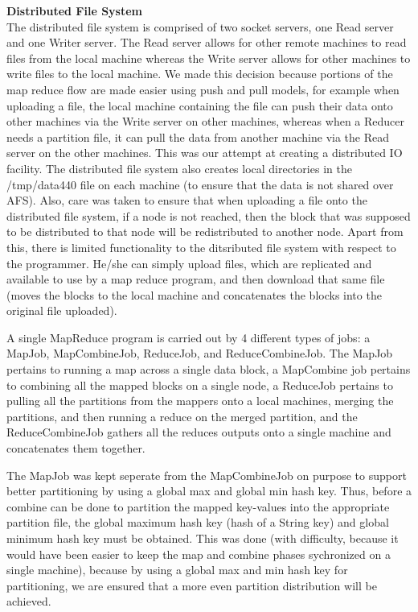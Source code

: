 \documentclass[11pt]{article}
\begin{document}
\textbf{Distributed File System}
\\The distributed file system is comprised of two socket servers, one Read server and one Writer server. The Read server allows for other remote machines to read files from the local machine whereas the Write server allows for other machines to write files to the local machine. We made this decision because portions of the map reduce flow are made easier using push and pull models, for example when uploading a file, the local machine containing the file can push their data onto other machines via the Write server on other machines, whereas when a Reducer needs a partition file, it can pull the data from another machine via the Read server on the other machines. This was our attempt at creating a distributed IO facility. The distributed file system also creates local directories in the /tmp/data440 file on each machine (to ensure that the data is not shared over AFS). Also, care was taken to ensure that when uploading a file onto the distributed file system, if a node is not reached, then the block that was supposed to be distributed to that node will be redistributed to another node. Apart from this, there is limited functionality to the ditsributed file system with respect to the programmer. He/she can simply upload files, which are replicated and available to use by a map reduce program, and then download that same file (moves the blocks to the local machine and concatenates the blocks into the original file uploaded).

A single MapReduce program is carried out by 4 different types of jobs: a MapJob, MapCombineJob, ReduceJob, and ReduceCombineJob. The MapJob pertains to running a map across a single data block, a MapCombine job pertains to combining all the mapped blocks on a single node, a ReduceJob pertains to pulling all the partitions from the mappers onto a local machines, merging the partitions, and then running a reduce on the merged partition, and the ReduceCombineJob gathers all the reduces outputs onto a single machine and concatenates them together. 

The MapJob was kept seperate from the MapCombineJob on purpose to support better partitioning by using a global max and global min hash key. Thus, before a combine can be done to partition the mapped key-values into the appropriate partition file, the global maximum hash key (hash of a String key) and global minimum hash key must be obtained. This was done (with difficulty, because it would have been easier to keep the map and combine phases sychronized on a single machine), because by using a global max and min hash key for partitioning, we are ensured that a more even partition distribution will be achieved.
\end{document}
